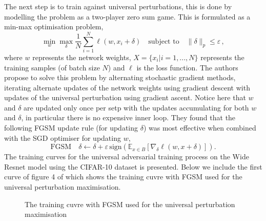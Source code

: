 \documentclass[12pt]{article}
\begin{document}
The next step is to train against universal perturbations, this is done by modelling the problem as a two-player zero sum game. This is formulated as a min-max optimisation problem, $$ \min_w \max_{\delta} \frac1N \sum_{i = 1}^N \ell(w, x_i + \delta) \quad \text{subject to} \quad \| \delta \|_p \leq \varepsilon \, ,$$ where $w$ represents the network weights, $X=\{x_i|i =1,...,N \}$ represents the training samples (of batch size $N$) and $\ell$ is the loss function. The authors propose to solve this problem by alternating stochastic gradient methods, iterating alternate updates of the network weights using gradient descent with updates of the universal perturbation using gradient ascent. Notice here that $w$ and $\delta$ are updated only once per setp with the updates accumulating for both $w$ and $\delta$, in particular there is no expensive inner loop. They found that the following FGSM update rule (for updating $\delta$) was most effective when combined with the SGD optimiser for updating $w$,
$$\text{FGSM} \quad \delta \leftarrow \delta + \varepsilon \, \text{sign}(\mathbb{E}_{x \in B}[\nabla_{\delta} \ell(w, x + \delta)]).$$ 
The training curves for the universal adversarial training process on the Wide Resnet model using the CIFAR-10 dataset is presented. Below we include the first curve of figure 4 of \cite{shafahi_universal_2018} which shows the training cuvre with FGSM used for the universal perturbation maximisation.
\begin{figure}[b] 
\caption{The training cuvre with FGSM used for the universal perturbation maximisation}
\centering
\end{figure}
\end{document}
